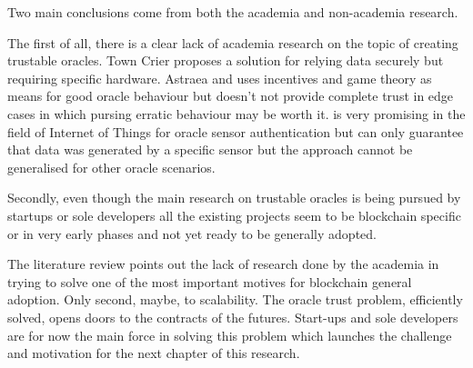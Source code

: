 Two main conclusions come from both the academia and non-academia research. 

The first of all, there is a clear lack of academia research on the topic of creating trustable oracles. Town Crier proposes a solution for relying data securely but requiring specific hardware. Astraea and \cite{MontotoMonroy2018BitcoinBlockchain} uses incentives and game theory as means for good oracle behaviour but doesn't not provide complete trust in edge cases in which pursing erratic behaviour may be worth it. \cite{Eberhardt2018Off-chainingComputations} is very promising in the field of Internet of Things for oracle sensor authentication but can only guarantee that data was generated by a specific sensor but the approach cannot be generalised for other oracle scenarios.

Secondly, even though the main research on trustable oracles is being pursued by startups or sole developers all the existing projects seem to be blockchain specific or in very early phases and not yet ready to be generally adopted.

The literature review points out the lack of research done by the academia in trying to solve one of the most important motives for blockchain general adoption. Only second, maybe, to scalability. The oracle trust problem, efficiently solved, opens doors to the contracts of the futures. Start-ups and sole developers are for now the main force in solving this problem which launches the challenge and motivation for the next chapter of this research.





